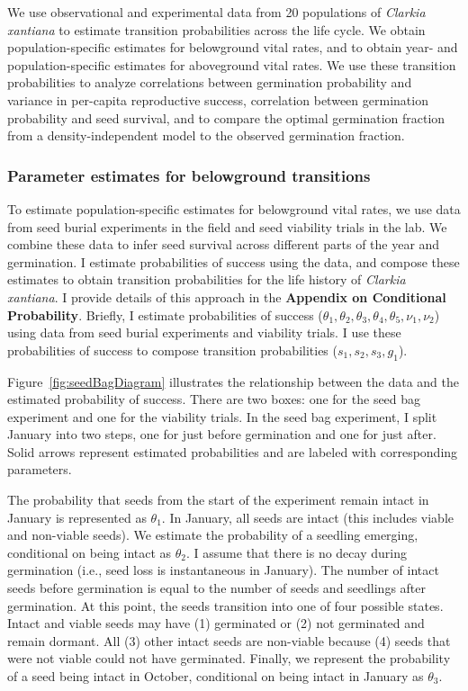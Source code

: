\documentclass[12pt, oneside, titlepage]{article}   	%
\begin{document}
We use observational and experimental data from 20 populations of \textit{Clarkia xantiana} to estimate transition probabilities across the life cycle. We obtain population-specific estimates for belowground vital rates, and to obtain year- and population-specific estimates for aboveground vital rates. We use these transition probabilities to analyze correlations between germination probability and variance in per-capita reproductive success, correlation between germination probability and seed survival, and to compare the optimal germination fraction from a density-independent model to the observed germination fraction. 

\subsubsection*{Parameter estimates for belowground transitions}

To estimate population-specific estimates for belowground vital rates, we use data from seed burial experiments in the field and seed viability trials in the lab. We combine these data to infer seed survival across different parts of the year and germination. I estimate probabilities of success using the data, and compose these estimates to obtain transition probabilities for the life history of \textit{Clarkia xantiana}. I provide details of this approach in the \textbf{Appendix on Conditional Probability}. Briefly, I estimate probabilities of success ($\theta_1, \theta_2, \theta_3, \theta_4, \theta_5, \nu_1, \nu_2$) using data from seed burial experiments and viability trials. I use these probabilities of success to compose transition probabilities ($s_1, s_2, s_3, g_1$).

Figure~\ref{fig:seedBagDiagram} illustrates the relationship between the data and the estimated probability of success. There are two boxes: one for the seed bag experiment and one for the viability trials. In the seed bag experiment, I split January into two steps, one for just before germination and one for just after. Solid arrows represent estimated probabilities and are labeled with corresponding parameters.
 
The probability that seeds from the start of the experiment remain intact in January is represented as $\theta_1$. In January, all seeds are intact (this includes viable and non-viable seeds). We estimate the probability of a seedling emerging, conditional on being intact as $\theta_2$. I assume that there is no decay during germination (i.e., seed loss is instantaneous in January). The number of intact seeds before germination is equal to the number of seeds and seedlings after germination. At this point, the seeds transition into one of four possible states. Intact and viable seeds may have (1) germinated or (2) not germinated and remain dormant. All (3) other intact seeds are non-viable because (4) seeds that were not viable could not have germinated. Finally, we represent the probability of a seed being intact in October, conditional on being intact in January as $\theta_3$.
\end{document}
